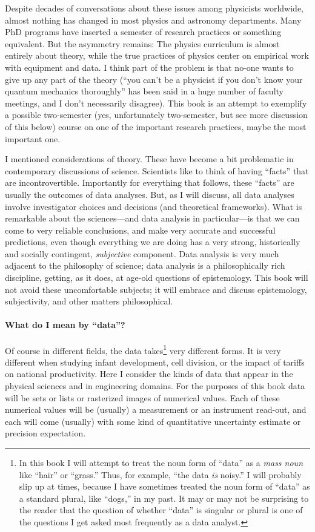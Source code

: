 Despite decades of conversations about these issues among physicists worldwide, almost nothing has changed in most physics and astronomy departments.
Many PhD programs have inserted a semester of research practices or something equivalent.
But the asymmetry remains:
The physics curriculum is almost entirely about theory, while the true practices of physics center on empirical work with equipment and data.
I think part of the problem is that no-one wants to give up any part of the theory (``you can't be a physicist if you don't know your quantum mechanics thoroughly'' has been said in a huge number of faculty meetings, and I don't necessarily disagree).
This book is an attempt to exemplify a possible two-semester (yes, unfortunately two-semester, but see more discussion of this below) course on one of the important research practices, maybe the most important one.

I mentioned considerations of theory.
These have become a bit problematic in contemporary discussions of science.
Scientists like to think of having ``facts'' that are incontrovertible.
Importantly for everything that follows, these ``facts'' are usually the outcomes of data analyses.
But, as I will discuss, all data analyses involve investigator choices and decisions (and theoretical frameworks).
What is remarkable about the sciences---and data analysis in particular---is that we can come to very reliable conclusions, and make very accurate and successful predictions, even though everything we are doing has a very strong, historically and socially contingent, \emph{subjective} component.
Data analysis is very much adjacent to the philosophy of science; data analysis is a philosophically rich discipline, getting, as it does, at age-old questions of epistemology.
This book will not avoid these uncomfortable subjects; it will embrace and discuss epistemology, subjectivity, and other matters philosophical.

\paragraph{What do I mean by ``data''?}
Of course in different fields, the data takes\footnote{%
In this book I will attempt to treat the noun form of ``data'' as a \emph{mass noun} like ``hair'' or ``grass.''
Thus, for example, ``the data \emph{is} noisy.''
I will probably slip up at times, because I have sometimes treated the noun form of ``data'' as a standard plural, like ``dogs,'' in my past.
It may or may not be surprising to the reader that the question of whether ``data'' is singular or plural is one of the questions I get asked most frequently as a data analyst.}
very different forms.
It is very different when studying infant development, cell division, or the impact of tariffs on national productivity.
Here I consider the kinds of data that appear in the physical sciences and in engineering domains.
For the purposes of this book data will be sets or lists or rasterized images of numerical values.
Each of these numerical values will be (usually) a measurement or an instrument read-out,
and each will come (usually) with some kind of quantitative uncertainty estimate or precision expectation.

